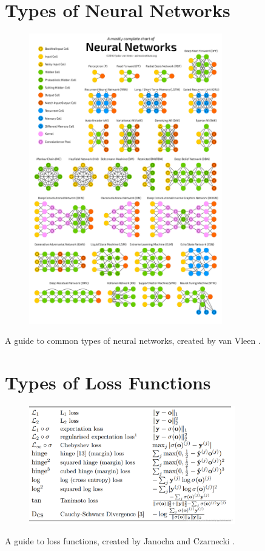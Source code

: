 \documentclass[12pt,letterpaper]{article}
\begin{document}
\begin{appendices}
\section{Types of Neural Networks}
\label{appendix:types_of_networks}
\begin{figure}[ht]
\centering
\includegraphics[width=0.75\textwidth]{types_of_NN.png}
\end{figure}
\begin{center}A guide to common types of neural networks, created by van Vleen \cite{types_of_NN_pic}.\end{center}
\newpage

\section{Types of Loss Functions}
\label{appendix:types_of_loss_functions}
\begin{figure}[ht]
\centering
\includegraphics[width=0.8\textwidth]{loss_functions.png}
\end{figure}
\begin{center}A guide to loss functions, created by Janocha and Czarnecki \cite{loss_functions_paper}.\end{center}
\newpage



\end{appendices}
\end{document}
